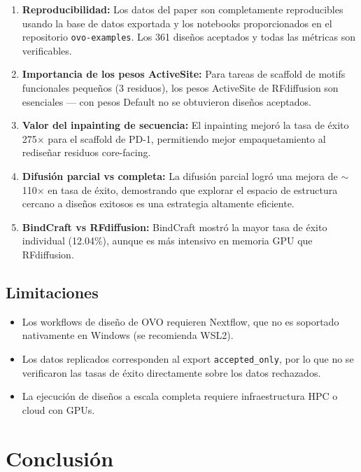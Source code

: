 \documentclass[10pt,a4paper,twocolumn]{article}
\begin{document}
\begin{enumerate}
    \item \textbf{Reproducibilidad:} Los datos del paper son completamente reproducibles usando la base de datos exportada y los notebooks proporcionados en el repositorio \texttt{ovo-examples}. Los 361 diseños aceptados y todas las métricas son verificables.

    \item \textbf{Importancia de los pesos ActiveSite:} Para tareas de scaffold de motifs funcionales pequeños (3 residuos), los pesos ActiveSite de RFdiffusion son esenciales — con pesos Default no se obtuvieron diseños aceptados.

    \item \textbf{Valor del inpainting de secuencia:} El inpainting mejoró la tasa de éxito 275$\times$ para el scaffold de PD-1, permitiendo mejor empaquetamiento al rediseñar residuos core-facing.

    \item \textbf{Difusión parcial vs completa:} La difusión parcial logró una mejora de $\sim$110$\times$ en tasa de éxito, demostrando que explorar el espacio de estructura cercano a diseños exitosos es una estrategia altamente eficiente.

    \item \textbf{BindCraft vs RFdiffusion:} BindCraft mostró la mayor tasa de éxito individual (12.04\%), aunque es más intensivo en memoria GPU que RFdiffusion.
\end{enumerate}

\subsection{Limitaciones}

\begin{itemize}
    \item Los workflows de diseño de OVO requieren Nextflow, que no es soportado nativamente en Windows (se recomienda WSL2).
    \item Los datos replicados corresponden al export \texttt{accepted\_only}, por lo que no se verificaron las tasas de éxito directamente sobre los datos rechazados.
    \item La ejecución de diseños a escala completa requiere infraestructura HPC o cloud con GPUs.
\end{itemize}

\section{Conclusión}
\end{document}

